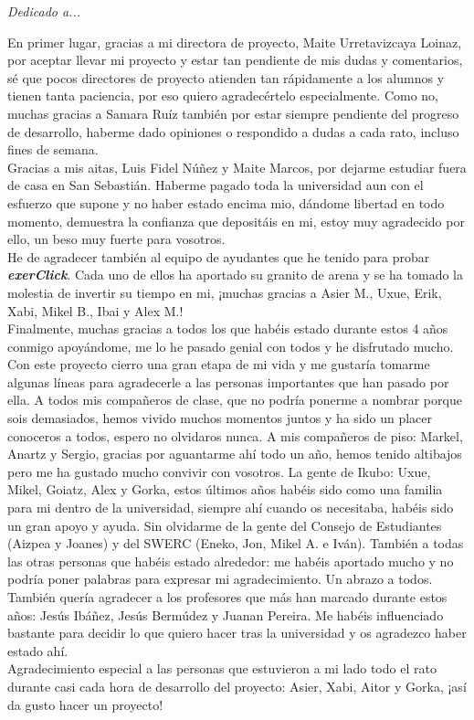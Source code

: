 \begin{flushright}
	\Large\textit{Dedicado a...}
\end{flushright}

En primer lugar, gracias a mi directora de proyecto, Maite Urretavizcaya Loinaz, por aceptar llevar mi proyecto y estar tan pendiente de mis dudas y comentarios, sé que pocos directores de proyecto atienden tan rápidamente a los alumnos y tienen tanta paciencia, por eso quiero agradecértelo especialmente. Como no, muchas gracias a Samara Ruíz también por estar siempre pendiente del progreso de desarrollo, haberme dado opiniones o respondido a dudas a cada rato, incluso fines de semana.\\

Gracias a mis aitas, Luis Fidel Núñez y Maite Marcos, por dejarme estudiar fuera de casa en San Sebastián. Haberme pagado toda la universidad aun con el esfuerzo que supone y no haber estado encima mio, dándome libertad en todo momento, demuestra la confianza que depositáis en mi, estoy muy agradecido por ello, un beso muy fuerte para vosotros.\\

He de agradecer también al equipo de ayudantes que he tenido para probar \textit{\textbf{exerClick}}. Cada uno de ellos ha aportado su granito de arena y se ha tomado la molestia de invertir su tiempo en mi, ¡muchas gracias a Asier M., Uxue, Erik, Xabi, Mikel B., Ibai y Alex M.!\\

Finalmente, muchas gracias a todos los que habéis estado durante estos 4 años conmigo apoyándome, me lo he pasado genial con todos y he disfrutado mucho. Con este proyecto cierro una gran etapa de mi vida y me gustaría tomarme algunas líneas para agradecerle a las personas importantes que han pasado por ella. A todos mis compañeros de clase, que no podría ponerme a nombrar porque sois demasiados, hemos vivido muchos momentos juntos y ha sido un placer conoceros a todos, espero no olvidaros nunca. A mis compañeros de piso: Markel, Anartz y Sergio, gracias por aguantarme ahí todo un año, hemos tenido altibajos pero me ha gustado mucho convivir con vosotros. La gente de Ikubo: Uxue, Mikel, Goiatz, Alex y Gorka, estos últimos años habéis sido como una familia para mi dentro de la universidad, siempre ahí cuando os necesitaba, habéis sido un gran apoyo y ayuda. Sin olvidarme de la gente del Consejo de Estudiantes (Aizpea y Joanes) y del SWERC (Eneko, Jon, Mikel A. e Iván). También a todas las otras personas que habéis estado alrededor: me habéis aportado mucho y no podría poner palabras para expresar mi agradecimiento. Un abrazo a todos.\\

También quería agradecer a los profesores que más han marcado durante estos años: Jesús Ibáñez, Jesús Bermúdez y Juanan Pereira. Me habéis influenciado bastante para decidir lo que quiero hacer tras la universidad y os agradezco haber estado ahí.\\

Agradecimiento especial a las personas que estuvieron a mi lado todo el rato durante casi cada hora de desarrollo del proyecto: Asier, Xabi, Aitor y Gorka, ¡así da gusto hacer un proyecto!\\